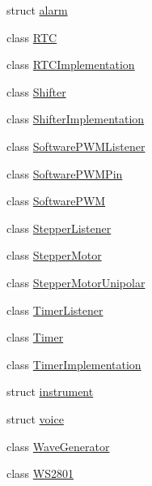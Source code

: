 \begin{DoxyCompactItemize}
\item 
struct \hyperlink{structmhvlib_1_1alarm}{alarm}
\item 
class \hyperlink{classmhvlib_1_1_r_t_c}{R\-T\-C}
\item 
class \hyperlink{classmhvlib_1_1_r_t_c_implementation}{R\-T\-C\-Implementation}
\item 
class \hyperlink{classmhvlib_1_1_shifter}{Shifter}
\item 
class \hyperlink{classmhvlib_1_1_shifter_implementation}{Shifter\-Implementation}
\item 
class \hyperlink{classmhvlib_1_1_software_p_w_m_listener}{Software\-P\-W\-M\-Listener}
\item 
class \hyperlink{classmhvlib_1_1_software_p_w_m_pin}{Software\-P\-W\-M\-Pin}
\item 
class \hyperlink{classmhvlib_1_1_software_p_w_m}{Software\-P\-W\-M}
\item 
class \hyperlink{classmhvlib_1_1_stepper_listener}{Stepper\-Listener}
\item 
class \hyperlink{classmhvlib_1_1_stepper_motor}{Stepper\-Motor}
\item 
class \hyperlink{classmhvlib_1_1_stepper_motor_unipolar}{Stepper\-Motor\-Unipolar}
\item 
class \hyperlink{classmhvlib_1_1_timer_listener}{Timer\-Listener}
\item 
class \hyperlink{classmhvlib_1_1_timer}{Timer}
\item 
class \hyperlink{classmhvlib_1_1_timer_implementation}{Timer\-Implementation}
\item 
struct \hyperlink{structmhvlib_1_1instrument}{instrument}
\item 
struct \hyperlink{structmhvlib_1_1voice}{voice}
\item 
class \hyperlink{classmhvlib_1_1_wave_generator}{Wave\-Generator}
\item 
class \hyperlink{classmhvlib_1_1_w_s2801}{W\-S2801}
\end{DoxyCompactItemize}
